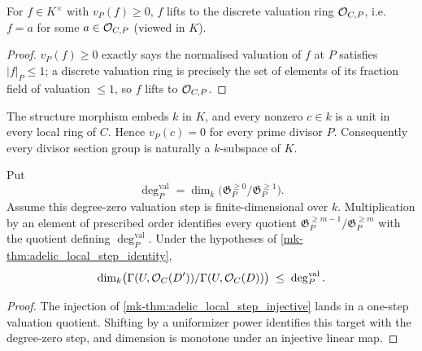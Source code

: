 \begin{lemma}
  \label{mk-lem:adelic_order_stalk_integral}
  \leanok
  For \(f \in K^\times\) with \(v_P(f) \ge 0\), \(f\) lifts to the
  discrete valuation ring \(\mathcal{O}_{C, P}\), i.e.\ \(f = a\) for some
  \(a \in \mathcal{O}_{C, P}\) (viewed in \(K\)).
\end{lemma}
\begin{proof}
  \leanok
  \(v_P(f) \ge 0\) exactly says the normalised valuation of \(f\) at
  \(P\) satisfies \(|f|_P \le 1\); a discrete valuation ring is
  precisely the set of elements of its fraction field of valuation
  \(\le 1\), so \(f\) lifts to \(\mathcal{O}_{C, P}\).
\end{proof}

\begin{theorem}
  \label{mk-thm:adelic_constant_field_order_zero}
  \leanok

  The structure morphism embeds \(k\) in \(K\), and every nonzero
  \(c\in k\) is a unit in every local ring of \(C\).  Hence
  \(v_P(c)=0\) for every prime divisor \(P\).  Consequently every divisor
  section group is naturally a \(k\)-subspace of \(K\).
\end{theorem}

\begin{theorem}
  \label{mk-thm:adelic_local_step_dim_le_residue_degree}
  \leanok
  Put
  \[
    \deg_P^{\mathrm{val}}
      =\dim_k\bigl(\mathfrak G_P^{\ge0}/\mathfrak G_P^{\ge1}\bigr).
  \]
  Assume this degree-zero valuation step is finite-dimensional over \(k\).
  Multiplication by an element of prescribed order identifies every
  quotient \(\mathfrak G_P^{\ge m-1}/\mathfrak G_P^{\ge m}\) with the
  quotient defining \(\deg_P^{\mathrm{val}}\).  Under the hypotheses of
  \ref{mk-thm:adelic_local_step_identity},
  \[
    \dim_k \bigl(\Gamma(U, \mathcal{O}_{C}(D'))/\Gamma(U, \mathcal{O}_{C}(D))\bigr)
      \;\le\; \deg_P^{\mathrm{val}}.
  \]
\end{theorem}
\begin{proof}
  \leanok
  The injection of \ref{mk-thm:adelic_local_step_injective} lands in a
  one-step valuation quotient.  Shifting by a uniformizer power identifies
  this target with the degree-zero step, and dimension is monotone under
  an injective linear map.
\end{proof}

